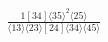 \documentclass[varwidth, border=5pt]{standalone}
\begin{document}
\begin{my}
$\begin{gathered}
\scriptscriptstyle\frac{1[34]⟨35⟩^2⟨25⟩}{⟨13⟩⟨23⟩[24]⟨34⟩⟨45⟩}
\end{gathered}$
\end{my}
\end{document}

